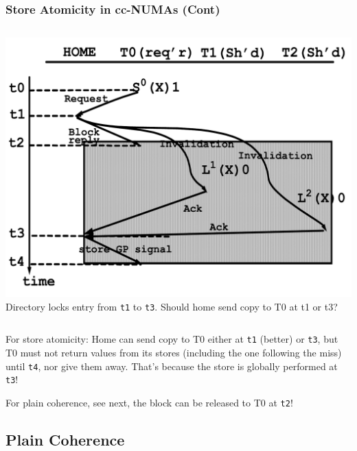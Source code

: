 \documentclass{beamer}
\renewcommand{\emph}[1]{\textcolor{structure}{#1}}
\newcommand{\emp}[1]{\textcolor{DikuRed}{ #1}}
\begin{document}
\begin{frame}[fragile,t]
\frametitle{Store Atomicity in cc-NUMAs (Cont)}

\begin{columns}
\includegraphics[width=44ex]{Ch7Figs/StoreAtomccNUMA}\pause
{}
Directory locks entry from {\tt t1} to {\tt t3}.
\alert{Should home send copy to T0 at t1 or t3?}
\end{columns}
\pause

\emph{For store atomicity:} Home can send copy to T0 either at {\tt t1} (better)
or {\tt t3}, but T0 must not return values from its stores (including the
one following the miss) until {\tt t4}, nor give them away.
That's because the store is globally performed at {\tt t3}!
\medskip

\emp{For plain coherence}, see next, the block can be released to T0 at {\tt t2}!

\end{frame}

\subsection{Plain Coherence}

\begin{frame}[fragile]
	\tableofcontents[currentsubsection]
\end{frame}
\end{document}
